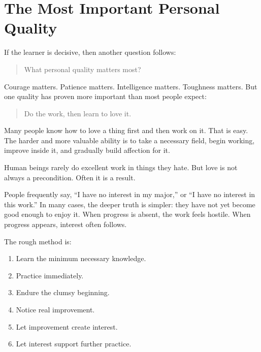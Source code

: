 \section*{The Most Important Personal Quality}

If the learner is decisive, then another question follows:

\begin{quote}
What personal quality matters most?
\end{quote}

Courage matters. Patience matters. Intelligence matters. Toughness matters. But one quality has proven more important than most people expect:

\begin{quote}
Do the work, then learn to love it.
\end{quote}

Many people know how to love a thing first and then work on it. That is easy. The harder and more valuable ability is to take a necessary field, begin working, improve inside it, and gradually build affection for it.

Human beings rarely do excellent work in things they hate. But love is not always a precondition. Often it is a result.

People frequently say, ``I have no interest in my major,'' or ``I have no interest in this work.'' In many cases, the deeper truth is simpler: they have not yet become good enough to enjoy it. When progress is absent, the work feels hostile. When progress appears, interest often follows.

The rough method is:

\begin{enumerate}
\item Learn the minimum necessary knowledge.
\item Practice immediately.
\item Endure the clumsy beginning.
\item Notice real improvement.
\item Let improvement create interest.
\item Let interest support further practice.
\end{enumerate}

